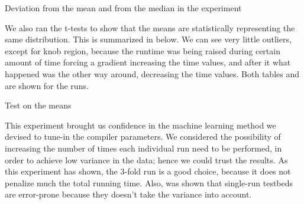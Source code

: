 \begin{table}
  \centering
  \begin{tiny}
  
  \end{tiny}
  \caption{Deviation from the mean and from the median in the experiment}
  \label{tab:simStats}
\end{table}

We also ran the t-tests to show that the means are statistically representing the same distribution. This is summarized in  below. We can see very little outliers, except for knob region, because the runtime was being raised during certain amount of time forcing a gradient increasing the time values, and after it what happened was the other way around, decreasing the time values. Both tables  and  are shown for the runs.

\begin{table}
  \centering
  \begin{tiny}
  
  \end{tiny}
  \caption{Test on the means}
  \label{tab:statTest}
\end{table}

This experiment brought us confidence in the machine learning method we devised to tune-in the compiler parameters. We considered the possibility of increasing the number of times each individual run need to be performed, in order to achieve low variance in the data; hence we could trust the results. As this experiment has shown, the $3$-fold run is a good choice, because it does not penalize much the total running time. Also, was shown that single-run testbeds are error-prone because they doesn't take the variance into account. %

%  

